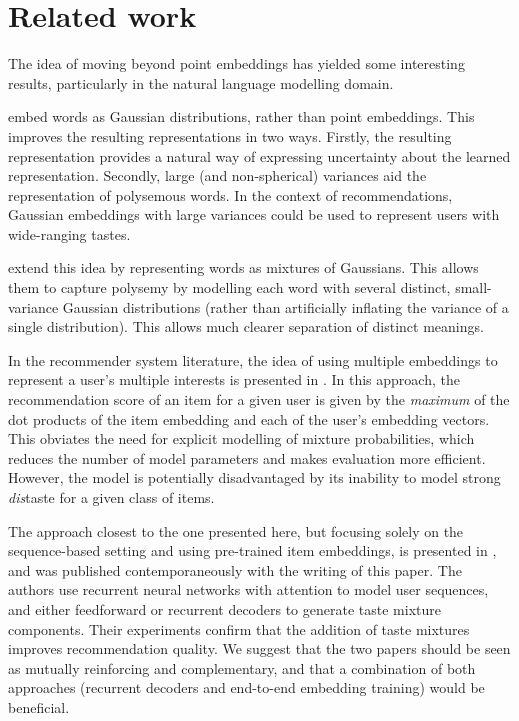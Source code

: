 \documentclass[sigconf]{acmart}
\begin{document}
\section{Related work}
The idea of moving beyond point embeddings has yielded some interesting results, particularly in the natural language modelling domain.

\citet{vilnis2014word} embed words as Gaussian distributions, rather than point embeddings. This improves the resulting representations in two ways. Firstly, the resulting representation provides a natural way of expressing uncertainty about the learned representation. Secondly, large (and non-spherical) variances aid the representation of polysemous words. In the context of recommendations, Gaussian embeddings with large variances could be used to represent users with wide-ranging tastes.

\citet{athiwaratkun2017multimodal} extend this idea by representing words as mixtures of Gaussians. This allows them to capture polysemy by modelling each word with several distinct, small-variance Gaussian distributions (rather than artificially inflating the variance of a single distribution). This allows much clearer separation of distinct meanings.

In the recommender system literature, the idea of using multiple embeddings to represent a user's multiple interests is presented in \citet{weston2013nonlinear}. In this approach, the recommendation score of an item for a given user is given by the \emph{maximum} of the dot products of the item embedding and each of the user's embedding vectors. This obviates the need for explicit modelling of mixture probabilities, which reduces the number of model parameters and makes evaluation more efficient. However, the model is potentially disadvantaged by its inability to model strong \emph{dis}taste for a given class of items.

The approach closest to the one presented here, but focusing solely on the sequence-based setting and using pre-trained item embeddings, is presented in \citet{wang2017attention}, and was published contemporaneously with the writing of this paper. The authors use recurrent neural networks with attention to model user sequences, and either feedforward or recurrent decoders to generate taste mixture components. Their experiments confirm that the addition of taste mixtures improves recommendation quality. We suggest that the two papers should be seen as mutually reinforcing and complementary, and that a combination of both approaches (recurrent decoders and end-to-end embedding training) would be beneficial.
\end{document}
